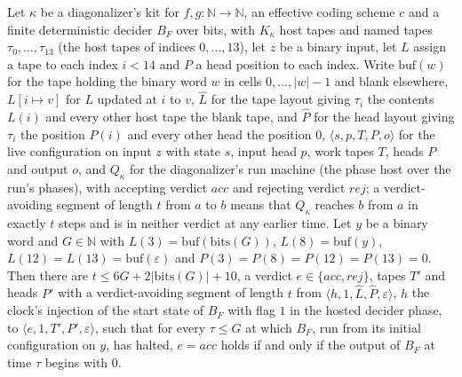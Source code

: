 \begin{theorem}
\label{Turing.NTimeDiag.dz_top_run}
\leanok
{}
Let $\kappa$ be a diagonalizer's kit for $f, g : \mathbb{N} \to \mathbb{N}$, an effective coding scheme $c$ and a finite deterministic decider $B_F$ over bits, with $K_\kappa$ host tapes and named tapes $\tau_0, \dots, \tau_{13}$ (the host tapes of indices $0, \dots, 13$), let $z$ be a binary input, let $L$ assign a tape to each index $i < 14$ and $P$ a head position to each index. Write $\mathrm{buf}(w)$ for the tape holding the binary word $w$ in cells $0, \dots, |w| - 1$ and blank elsewhere, $L[i \mapsto v]$ for $L$ updated at $i$ to $v$, $\hat L$ for the tape layout giving $\tau_i$ the contents $L(i)$ and every other host tape the blank tape, and $\hat P$ for the head layout giving $\tau_i$ the position $P(i)$ and every other head the position $0$, $\langle s, p, T, P, o\rangle$ for the live configuration on input $z$ with state $s$, input head $p$, work tapes $T$, heads $P$ and output $o$, and $Q_\kappa$ for the diagonalizer's run machine (the phase host over the run's phases), with accepting verdict $\mathit{acc}$ and rejecting verdict $\mathit{rej}$; a verdict-avoiding segment of length $t$ from $a$ to $b$ means that $Q_\kappa$ reaches $b$ from $a$ in exactly $t$ steps and is in neither verdict at any earlier time. Let $y$ be a binary word and $G \in \mathbb{N}$ with $L(3) = \mathrm{buf}(\mathrm{bits}(G))$, $L(8) = \mathrm{buf}(y)$, $L(12) = L(13) = \mathrm{buf}(\varepsilon)$ and $P(3) = P(8) = P(12) = P(13) = 0$. Then there are $t \le 6G + 2|\mathrm{bits}(G)| + 10$, a verdict $e \in \{\mathit{acc}, \mathit{rej}\}$, tapes $T'$ and heads $P'$ with a verdict-avoiding segment of length $t$ from $\langle h, 1, \hat L, \hat P, \varepsilon\rangle$, $h$ the clock's injection of the start state of $B_F$ with flag $1$ in the hosted decider phase, to $\langle e, 1, T', P', \varepsilon\rangle$, such that for every $\tau \le G$ at which $B_F$, run from its initial configuration on $y$, has halted, $e = \mathit{acc}$ holds if and only if the output of $B_F$ at time $\tau$ begins with $0$.

\end{theorem}
